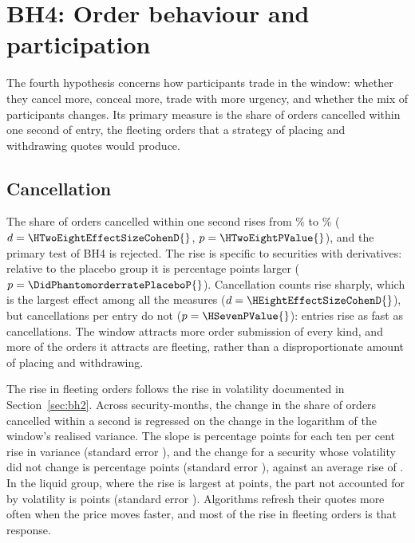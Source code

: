 \section{BH4: Order behaviour and participation}\label{sec:bh4}\label{sec:activity}

The fourth hypothesis concerns how participants trade in the window: whether they cancel more,
conceal more, trade with more urgency, and whether the mix of participants changes. Its primary
measure is the share of orders cancelled within one second of entry, the fleeting orders that a
strategy of placing and withdrawing quotes would produce.

\subsection{Cancellation}

The share of orders cancelled within one second rises from \LifePhantomRateControl{}\% to
\LifePhantomRateExpiry{}\% ($d = \HTwoEightEffectSizeCohenD{}$, $p = \HTwoEightPValue{}$), and
the primary test of BH4 is rejected. The rise is specific to securities with derivatives:
relative to the placebo group it is \DidPhantomorderratePlaceboPp{} percentage points larger
($p = \DidPhantomorderratePlaceboP{}$). Cancellation counts rise sharply, which is the largest
effect among all the measures ($d = \HEightEffectSizeCohenD{}$), but cancellations per entry do
not ($p = \HSevenPValue{}$): entries rise as fast as cancellations. The window attracts more
order submission of every kind, and more of the orders it attracts are fleeting, rather than a
disproportionate amount of placing and withdrawing.

The rise in fleeting orders follows the rise in volatility documented in
Section~\ref{sec:bh2}. Across security-months, the change in the share of orders cancelled
within a second is regressed on the change in the logarithm of the window's realised variance.
The slope is \FleetvolAllSlope{} percentage points for each ten per cent rise in variance (standard error
\FleetvolAllSlopeSe{}), and the change for a security whose volatility did not change is
\FleetvolAllIntercept{} percentage points (standard error \FleetvolAllInterceptSe{}),
against an average rise of \FleetvolAllRaw{}. In the liquid group, where the rise is largest at
\FleetvolLiquidRaw{} points, the part not accounted for by volatility is
\FleetvolLiquidIntercept{} points (standard error \FleetvolLiquidInterceptSe{}). Algorithms
refresh their quotes more often when the price moves faster, and most of the rise in fleeting
orders is that response.

